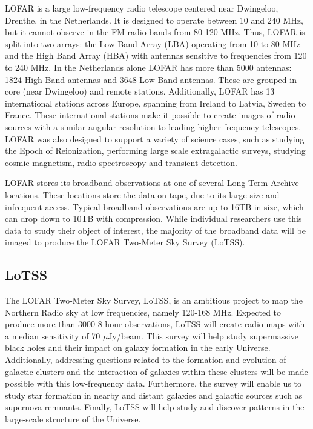 \Gls{LOFAR} is a large low-frequency radio telescope centered near Dwingeloo, Drenthe, in the Netherlands\citep{vanHaarlem2013}. It is designed to operate between 10 and 240 MHz, but it cannot observe in the FM radio bands from 80-120 MHz. Thus, LOFAR is split into two arrays: the Low Band Array (LBA) operating from 10 to 80 MHz and the High Band Array (HBA) with antennas sensitive to frequencies from 120 to 240 MHz. In the Netherlands alone LOFAR has more than 5000 antennas: 1824 High-Band antennas and 3648 Low-Band antennas. These are grouped in core (near Dwingeloo) and remote stations\citep{LOFAR_Stations}. Additionally, LOFAR has 13 international stations across Europe, spanning from Ireland to Latvia, Sweden to France\citep{lofar_brochure_2019}. These international stations make it possible to create images of radio sources with a similar angular resolution to leading higher frequency telescopes. LOFAR was also designed to support a variety of science cases, such as studying the Epoch of Reionization\citep{patil2017upper}, performing large scale extragalactic surveys\citep{LOTSS_DR2,lotss, MSSS}, studying cosmic magnetism, radio spectroscopy\citep{oonk2017, emig2019, Arias2018, salas2018} and transient detection\citep{lofar_trans1, lofar_trans2}.

LOFAR stores its broadband observations at one of several Long-Term Archive locations. These locations store the data on tape, due to its large size and infrequent access. Typical broadband observations are up to 16TB in size, which can drop down to 10TB with compression. While individual researchers use this data to study their object of interest, the majority of the broadband data will be imaged to produce the LOFAR Two-Meter Sky Survey (LoTSS). 


\subsection{LoTSS} 

The LOFAR Two-Meter Sky Survey, \Gls{LoTSS}\citep{lotss}, is an ambitious project to map the Northern Radio sky at low frequencies, namely 120-168 MHz. Expected to produce more than 3000 8-hour observations, LoTSS will create radio maps with a median sensitivity of 70 $\mu$Jy/beam. This survey will help study supermassive black holes and their impact on galaxy formation in the early Universe. Additionally, addressing questions related to the formation and evolution of galactic clusters and the interaction of galaxies within these clusters will be made possible with this low-frequency data. Furthermore, the survey will enable us to study star formation in nearby and distant galaxies and galactic sources such as supernova remnants. Finally, LoTSS will help study and discover patterns in the large-scale structure of the Universe. 

